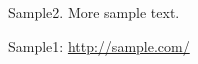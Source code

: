 \begin{thebibliography}{99}


 Sample2. More sample text.

 Sample1: \url{http://sample.com/}

\end{thebibliography}







